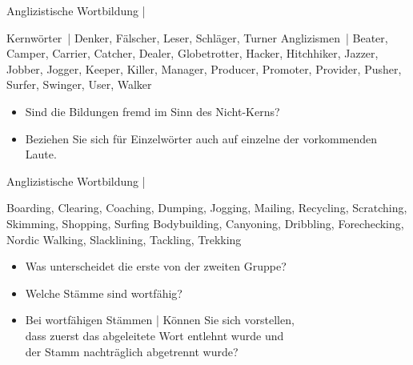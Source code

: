 \begin{frame}
  {Anglizistische Wortbildung | }
  \onslide<+->
  \onslide<+->
  \begin{exe}
    \ex \alert{Kernwörter} | Denker, Fälscher, Leser, Schläger, Turner
    \onslide<+->
    \Zeile
    \ex \alert{Anglizismen} | Beater, Camper, Carrier, Catcher, Dealer, Globetrotter, Hacker, Hitchhiker, Jazzer, Jobber, Jogger, Keeper, Killer, Manager, Producer, Promoter, Provider, Pusher, Surfer, Swinger, User, Walker
  \end{exe}
  \onslide<+->
  \Zeile
  \begin{itemize}[<+->]
    \item Sind die Bildungen \alert{fremd} im Sinn des Nicht-Kerns?
    \item Beziehen Sie sich für Einzelwörter auch auf einzelne der vorkommenden Laute.
  \end{itemize}
\end{frame}

\begin{frame}
  {Anglizistische Wortbildung | }
  \onslide<+->
  \onslide<+->
  \begin{exe}
    \ex Boarding, Clearing, Coaching, Dumping, Jogging, Mailing, Recycling,
Scratching, Skimming, Shopping, Surfing
    \onslide<+->
    \Halbzeile
    \ex Bodybuilding, Canyoning, Dribbling, Forechecking, Nordic Walking, Slacklining, Tackling, Trekking
  \end{exe}
  \onslide<+->
  \Zeile
  \begin{itemize}[<+->]
    \item Was unterscheidet die erste von der zweiten Gruppe?
    \item Welche Stämme sind \alert{wortfähig}?
    \item Bei wortfähigen Stämmen | Können Sie sich vorstellen,\\
      dass \alert{zuerst das abgeleitete Wort entlehnt wurde} und\\
      der Stamm nachträglich abgetrennt wurde?
  \end{itemize}
\end{frame}

